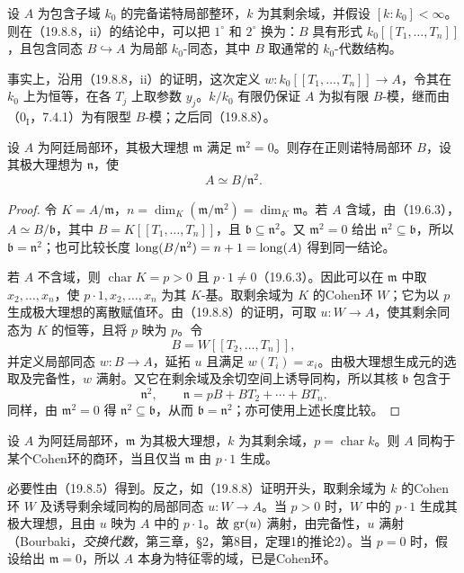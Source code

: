 设 $A$ 为包含子域 $k_0$ 的完备诺特局部整环，$k$ 为其剩余域，并假设 $[k:k_0]<\infty$。则在（19.8.8，ii）的结论中，可以把 $1^\circ$ 和 $2^\circ$ 换为：$B$ 具有形式 $k_0[[T_1,\ldots,T_n]]$，且包含同态 $B\hookrightarrow A$ 为局部 $k_0$-同态，其中 $B$ 取通常的 $k_0$-代数结构。

事实上，沿用（19.8.8，ii）的证明，这次定义 $w:k_0[[T_1,\ldots,T_n]]\to A$，令其在 $k_0$ 上为恒等，在各 $T_j$ 上取参数 $y_j$。$k/k_0$ 有限仍保证 $A$ 为拟有限 $B$-模，继而由（$0_{\mathrm I}$，7.4.1）为有限型 $B$-模；之后同（19.8.8）。

设 $A$ 为阿廷局部环，其极大理想 $\mathfrak m$ 满足 $\mathfrak m^2=0$。则存在正则诺特局部环 $B$，设其极大理想为 $\mathfrak n$，使
\[
 A\simeq B/\mathfrak n^2.
\]

\begin{proof}
令 $K=A/\mathfrak m$，$n=\dim_K(\mathfrak m/\mathfrak m^2)=\dim_K\mathfrak m$。若 $A$ 含域，由（19.6.3），$A\simeq B/\mathfrak b$，其中 $B=K[[T_1,\ldots,T_n]]$，且 $\mathfrak b\subseteq\mathfrak n^2$。又 $\mathfrak m^2=0$ 给出 $\mathfrak n^2\subseteq\mathfrak b$，所以 $\mathfrak b=\mathfrak n^2$；也可比较长度 $\operatorname{long}(B/\mathfrak n^2)=n+1=\operatorname{long}(A)$ 得到同一结论。

若 $A$ 不含域，则 $\operatorname{char}K=p>0$ 且 $p\cdot1\ne0$（19.6.3）。因此可以在 $\mathfrak m$ 中取 $x_2,\ldots,x_n$，使 $p\cdot1,x_2,\ldots,x_n$ 为其 $K$-基。取剩余域为 $K$ 的Cohen环 $W$；它为以 $p$ 生成极大理想的离散赋值环。由（19.8.8）的证明，可取 $u:W\to A$，使其剩余同态为 $K$ 的恒等，且将 $p$ 映为 $p$。令
\[
 B=W[[T_2,\ldots,T_n]],
\]
并定义局部同态 $w:B\to A$，延拓 $u$ 且满足 $w(T_i)=x_i$。由极大理想生成元的选取及完备性，$w$ 满射。又它在剩余域及余切空间上诱导同构，所以其核 $\mathfrak b$ 包含于
\[
 \mathfrak n^2,\qquad \mathfrak n=pB+BT_2+\cdots+BT_n.
\]
同样，由 $\mathfrak m^2=0$ 得 $\mathfrak n^2\subseteq\mathfrak b$，从而 $\mathfrak b=\mathfrak n^2$；亦可使用上述长度比较。
\end{proof}

设 $A$ 为阿廷局部环，$\mathfrak m$ 为其极大理想，$k$ 为其剩余域，$p=\operatorname{char}k$。则 $A$ 同构于某个Cohen环的商环，当且仅当 $\mathfrak m$ 由 $p\cdot1$ 生成。

必要性由（19.8.5）得到。反之，如（19.8.8）证明开头，取剩余域为 $k$ 的Cohen环 $W$ 及诱导剩余域同构的局部同态 $u:W\to A$。当 $p>0$ 时，$W$ 中的 $p\cdot1$ 生成其极大理想，且由 $u$ 映为 $A$ 中的 $p\cdot1$。故 $\operatorname{gr}(u)$ 满射，由完备性，$u$ 满射（Bourbaki，\textit{交换代数}，第三章，§2，第8目，定理1的推论2）。当 $p=0$ 时，假设给出 $\mathfrak m=0$，所以 $A$ 本身为特征零的域，已是Cohen环。
